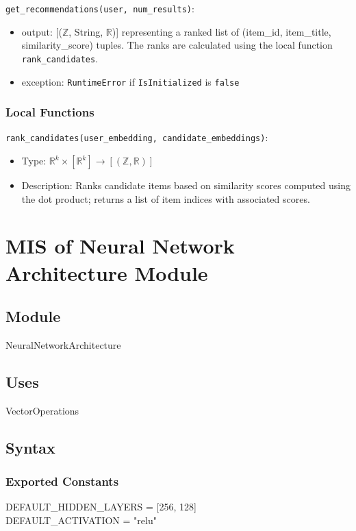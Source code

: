 \documentclass[12pt, titlepage]{article}
\begin{document}
\noindent \texttt{get\_recommendations(user, num\_results)}:
\begin{itemize}
  \item output: [($\mathbb{Z}$, String, $\mathbb{R}$)] representing a ranked list of (item\_id, item\_title, similarity\_score) tuples. The ranks are calculated using the local function \texttt{rank\_candidates}.
  \item exception: \texttt{RuntimeError} if \texttt{IsInitialized} is \texttt{false}
\end{itemize}

\subsubsection{Local Functions}

\noindent \texttt{rank\_candidates(user\_embedding, candidate\_embeddings)}:
\begin{itemize}
  \item Type: $\mathbb{R}^k \times [\mathbb{R}^k] \rightarrow [(\mathbb{Z}, \mathbb{R})]$
  \item Description: Ranks candidate items based on similarity scores computed using the dot product; returns a list of item indices with associated scores.
\end{itemize}


\newpage

\section{MIS of Neural Network Architecture Module} \label{ModuleNNA}

\subsection{Module}

NeuralNetworkArchitecture

\subsection{Uses}
VectorOperations

\subsection{Syntax}

\subsubsection{Exported Constants}
DEFAULT\_HIDDEN\_LAYERS = [256, 128]\\
DEFAULT\_ACTIVATION = "relu"
\end{document}

